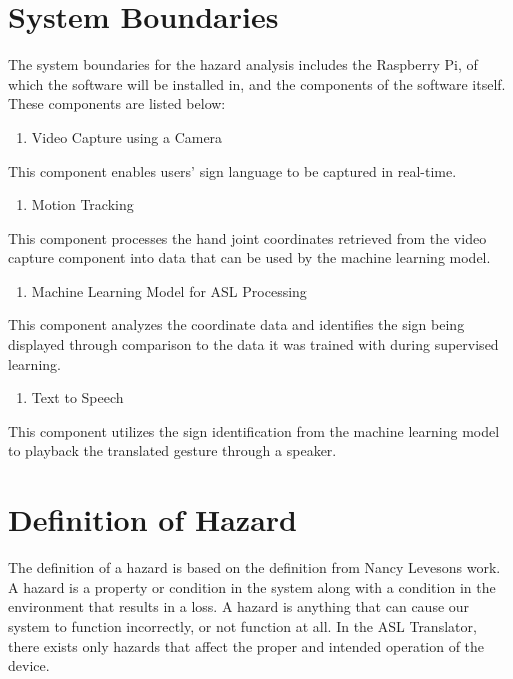 \documentclass{article}
\begin{document}
\section{System Boundaries}

The system boundaries for the hazard analysis includes the Raspberry Pi, of which the software will be installed in, and the components of the software itself. These components
are listed below:

\begin{enumerate}
    \item Video Capture using a Camera
\end{enumerate}

\hspace*{9mm}This component enables users' sign language to be captured in real-time.

\begin{enumerate}[resume]
    \item Motion Tracking
\end{enumerate}

\hspace*{9mm}\hangindent=9mm This component processes the hand joint coordinates retrieved from the video capture component into data that can be used by the machine learning model.

\begin{enumerate}[resume]
    \item Machine Learning Model for ASL Processing
\end{enumerate}

\hspace*{9mm}\hangindent=9mm This component analyzes the coordinate data and identifies the sign being displayed through comparison to the data it was trained with during supervised learning.

\begin{enumerate}[resume]
    \item Text to Speech
\end{enumerate}

\hspace*{9mm}\hangindent=9mm This component utilizes the sign identification from the machine learning model to playback the translated gesture through a speaker.

\section{Definition of Hazard}

The definition of a hazard is based on the definition from Nancy Leveson\textquotesingle s work. A hazard is a property or condition in the system along with a condition in the
environment that results in a loss. A hazard is anything that can cause our system to function incorrectly, or not function at all. In the ASL Translator, there
exists only hazards that affect the proper and intended operation of the device.\\
\end{document}

